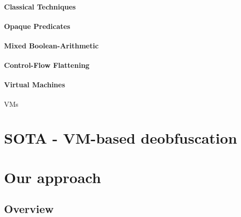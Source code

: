 \subsubsection{Classical Techniques}

\subsubsection{Opaque Predicates}

\subsubsection{Mixed Boolean-Arithmetic}

\subsubsection{Control-Flow Flattening}

\subsubsection{Virtual Machines}

\cite{malware_obf}



\Glspl{VM} 


\chapter{SOTA - VM-based deobfuscation} %


\chapter{Our approach}

\section{Overview}

